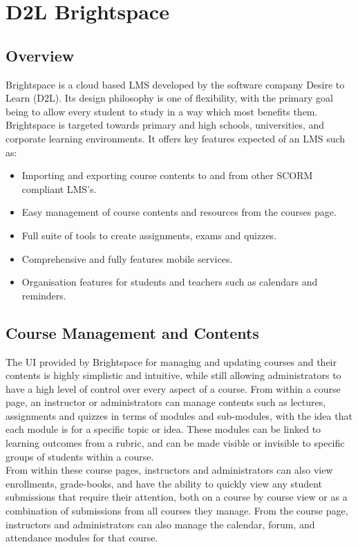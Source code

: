 \section{D2L Brightspace}
\subsection{Overview}
Brightspace is a cloud based LMS developed by the software company Desire to Learn (D2L). Its design philosophy is one of flexibility, with the primary goal being to allow every student to study in a way which most benefits them. Brightspace is targeted towards primary and high schools, universities, and corporate learning environments. It offers key features expected of an LMS such as:
\begin{itemize}
  \item Importing and exporting course contents to and from other SCORM compliant LMS's.
  \item Easy management of course contents and resources from the courses page.
  \item Full suite of tools to create assignments, exams and quizzes.
  \item Comprehensive and fully features mobile services.
  \item Organisation features for students and teachers such as calendars and reminders.
\end{itemize}
\cite{brightspaceLMS}

\subsection{Course Management and Contents}
The UI provided by Brightspace for managing and updating courses and their contents is highly simplistic and intuitive, while still allowing administrators to have a high level of control over every aspect of a course. From within a course page, an instructor or administrators can manage contents such as lectures, assignments and quizzes in terms of modules and sub-modules, with the idea that each module is for a specific topic or idea. These modules can be linked to learning outcomes from a rubric, and can be made visible or invisible to specific groups of students within a course.\\ 
From within these course pages, instructors and administrators can also view enrollments, grade-books, and have the ability to quickly view any student submissions that require their attention, both on a course by course view or as a combination of submissions from all courses they manage. From the course page, instructors and administrators can also manage the calendar, forum, and attendance modules for that course.

